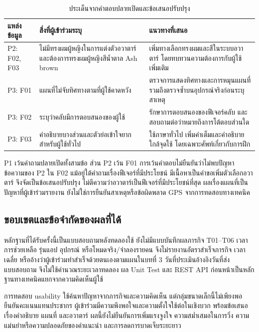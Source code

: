 \begin{table}[H]
\centering\small\setlength{\tabcolsep}{4pt}\renewcommand{\arraystretch}{1.15}
\caption{ประเด็นจากคำตอบปลายเปิดและข้อเสนอปรับปรุง}\label{tab:user-eval-feedback}
\begin{tabular}{|l|>{\raggedright\arraybackslash}p{}|>{\raggedright\arraybackslash}p{}|}\hline
\textbf{แหล่งข้อมูล} & \textbf{สิ่งที่ผู้เข้าร่วมระบุ} & \textbf{แนวทางที่เสนอ} \\ \hline
P2: F02, F03 & ไม่มีทรงผมผู้หญิงในการแต่งตัวอวาตาร์ และต้องการทรงผมผู้หญิงสีน้ำตาล Ash brown & เพิ่มทางเลือกทรงผมและสีในระบบอวาตาร์ โดยทบทวนความต้องการกับผู้ใช้เพิ่มเติม \\ \hline
P3: F01 & แผนที่ไม่จับทิศทางตามที่ผู้ใช้คาดหวัง & ตรวจการแสดงทิศทางและการหมุนแผนที่ รวมถึงตรวจซ้ำบนอุปกรณ์จริงก่อนระบุสาเหตุ \\ \hline
P3: F02 & ระบุว่าคลับมีการตอบสนองของผู้ใช้ & รักษาการตอบสนองของฟีเจอร์คลับ และสอบถามต่อว่าหมายถึงการโต้ตอบส่วนใด \\ \hline
P3: F03 & คำอธิบายบางส่วนและตัวย่อเข้าใจยากสำหรับผู้ใช้ทั่วไป & ใช้ภาษาทั่วไป เพิ่มคำเต็มและคำอธิบายใกล้จุดใช้ โดยเฉพาะศัพท์เกี่ยวกับการฝึก \\ \hline
\end{tabular}
\end{table}

P1 เว้นคำถามปลายเปิดทั้งสามข้อ ส่วน P2 เว้น F01 การเว้นคำตอบไม่ยืนยันว่าไม่พบปัญหา ข้อความของ P2 ใน F02 แม้อยู่ใต้คำถามเรื่องฟีเจอร์ที่มีประโยชน์ มีเนื้อหาเป็นคำขอเพิ่มตัวเลือกอวาตาร์ จึงจัดเป็นข้อเสนอปรับปรุง ไม่ตีความว่าอวาตาร์เป็นฟีเจอร์ที่มีประโยชน์ที่สุด ผลเรื่องแผนที่เป็นปัญหาที่ผู้เข้าร่วมรายงาน ยังไม่ใช่การยืนยันสาเหตุหรือข้อผิดพลาด GPS จากการทดสอบทางเทคนิค

\subsection{ขอบเขตและข้อจำกัดของผลที่ได้}

หลักฐานที่ได้รับครั้งนี้เป็นแบบสอบถามหลังทดลองใช้ ยังไม่มีแบบบันทึกผลภารกิจ T01--T06 เวลา การช่วยเหลือ รุ่นแอป อุปกรณ์ หรือโหมดจริง/จำลองรายคน จึงไม่รายงานอัตราสำเร็จภารกิจ เวลาเฉลี่ย หรืออ้างว่าผู้เข้าร่วมทำสำเร็จด้วยตนเองตามแผนในบทที่ 3 วันที่ประเมินอ้างอิงวันที่ส่งแบบสอบถาม จึงไม่ใช้คำนวณระยะเวลาทดลอง ผล Unit Test และ REST API ก่อนหน้าเป็นหลักฐานทางเทคนิคแยกจากความคิดเห็นผู้ใช้

การทดสอบ usability ใช้ค้นหาปัญหาจากภารกิจและความคิดเห็น แต่กลุ่มขนาดเล็กนี้ไม่เพียงพอยืนยันคะแนนแทนประชากร \cite{moran2019usability,budiu2021five} ผู้เข้าร่วมมีความพึงพอใจและความตั้งใจใช้ต่อในเชิงบวก พร้อมข้อเสนอเรื่องคำอธิบาย แผนที่ และอวาตาร์ ผลนี้ยังไม่ยืนยันการเพิ่มแรงจูงใจ ความสม่ำเสมอในการวิ่ง ความแม่นยำหรือความปลอดภัยของคำแนะนำ และการลดการบาดเจ็บระยะยาว

